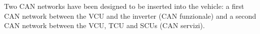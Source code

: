 Two C\-A\-N networks have been designed to be inserted into the vehicle\-: a first C\-A\-N network between the V\-C\-U and the inverter (C\-A\-N funzionale) and a second C\-A\-N network between the V\-C\-U, T\-C\-U and S\-C\-Us (C\-A\-N servizi). 